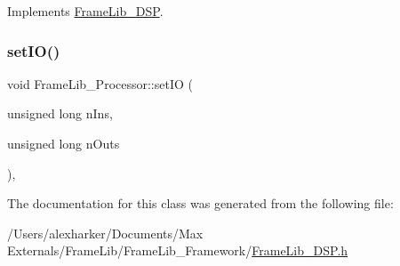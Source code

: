 Implements \hyperlink{class_frame_lib___d_s_p}{Frame\+Lib\+\_\+\+D\+SP}.

\mbox{\label{class_frame_lib___processor_a84035040e5e1cff07e16502ee290881e}} 
\subsubsection{\texorpdfstring{set\+I\+O()}{setIO()}}
{\footnotesize\ttfamily void Frame\+Lib\+\_\+\+Processor\+::set\+IO (\begin{DoxyParamCaption}\item[{unsigned long}]{n\+Ins,  }\item[{unsigned long}]{n\+Outs }\end{DoxyParamCaption})\hspace{0.3cm}{\ttfamily [inline]}, {\ttfamily [protected]}}



The documentation for this class was generated from the following file\+:\begin{DoxyCompactItemize}
\item 
/\+Users/alexharker/\+Documents/\+Max Externals/\+Frame\+Lib/\+Frame\+Lib\+\_\+\+Framework/\hyperlink{_frame_lib___d_s_p_8h}{Frame\+Lib\+\_\+\+D\+S\+P.\+h}\end{DoxyCompactItemize}

